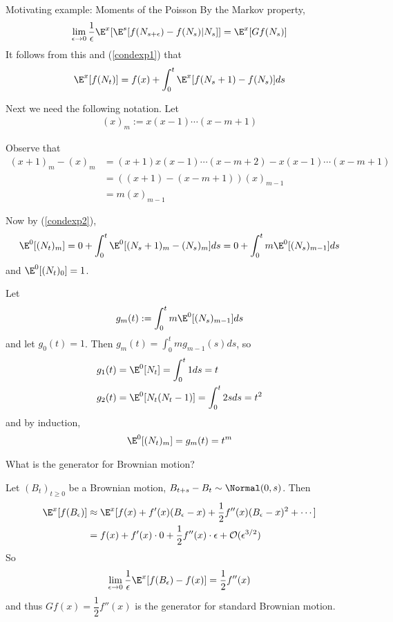 \begin{exmp}{Motivating example: Moments of the Poisson}
 By the Markov property, 
$$\begin{aligned}
 \lim_{\epsilon \to 0}   \frac{1}{\epsilon} \E^x [ \E^s [f(N_{s+\epsilon}) - f(N_s) | N_s] ] =  \E^x[Gf(N_s)]
 \end{aligned}$$
It follows from this and (\ref{condexp1}) that
 \begin{align}
 \label{condexp2}
 \E^x[f(N_t)] = f(x) + \int_0^t \E^x [f(N_s + 1) - f(N_s) ] ds
 \end{align}
 
Next we need the following notation. Let 
$$\begin{aligned}
(x)_m := x(x-1) \cdots (x-m+1)
\end{aligned}$$

Observe that 
$$\begin{aligned}
(x+1)_m - (x)_m &= (x+1) x (x-1) \cdots (x-m+2) - x (x-1) \cdots (x-m+1)\\
& = ( (x+1) - (x-m+1) ) (x)_{m-1} \\
&= m(x)_{m-1}
\end{aligned}$$

Now by (\ref{condexp2}),
$$\begin{aligned}
\E^0 [ (N_t)_m ] =0 + \int_0^{t}  \E^{0} [(N_s+1)_m - (N_s)_{m}] ds = 0 + \int_0^{t} m \E^{0} [(N_s)_{m-1}] ds 
\end{aligned}$$
and $\E^0 [ (N_t)_0 ] = 1$. 

Let 
$$\begin{aligned}
g_{m}(t) := \int_0^{t} m \E^{0} [(N_s)_{m-1}] ds
\end{aligned}$$ 
and let $g_0(t) = 1$. 
Then $g_{m}(t) = \int_0^{t} m g_{m-1}(s) ds$, so
$$\begin{aligned}
g_1(t) &=  \E^0 [N_t]=  \int_{0}^{t}  1ds = t \\
g_2(t) &= \E^0 [N_t(N_t - 1)]  =  \int_{0}^{t}  2sds = t^2 \\
\end{aligned}$$
and by induction,
$$\begin{aligned}
  \E^0 [(N_t)_m] = g_m(t) = t^m
  \end{aligned}$$
\end{exmp}

\begin{exmp}{What is the generator for Brownian motion?}

Let $(B_t)_{t \geq 0}$ be a Brownian motion, $B_{t+s} - B_t \sim \Normal(0, s)$. 
Then
$$\begin{aligned}
\E^x[f(B_\epsilon)] &\approx \E^x[ f(x) + f'(x) (B_\epsilon - x) + \frac{1}{2}f''(x)(B_\epsilon - x)^2 + \cdots] \\
& =  f(x) + f'(x)\cdot 0 +  \frac{1}{2}f''(x) \cdot \epsilon + \mathcal{O}(\epsilon^{3/2})
\end{aligned}$$
So
$$\begin{aligned}
\lim_{\epsilon \to 0} \dfrac{1}{\epsilon} \E^{x}[ f(B_\epsilon) - f(x) ] = \dfrac{1}{2} f''(x)
\end{aligned}$$
and thus $Gf(x) = \dfrac{1}{2} f''(x)$ is the generator for standard Brownian motion. 

\end{exmp}

